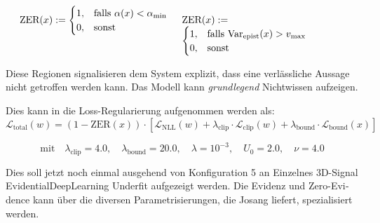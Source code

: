 \begin{otherlanguage}{ngerman}
\begin{equation*}
\begin{minipage}[t]{0.48\linewidth}
\raggedright
$\displaystyle
\text{ZER}(x) := 
\begin{cases}
1, & \text{falls } \alpha(x) < \alpha_{\min} \\
0, & \text{sonst}
\end{cases}
$
\end{minipage}
\hfill
\begin{minipage}[t]{0.48\linewidth}
\raggedright
$\displaystyle
\text{ZER}(x) := 
\begin{cases}
1, & \text{falls } \text{Var}_{\text{epist}}(x) > v_{\max} \\
0, & \text{sonst}
\end{cases}
$
\end{minipage}
\end{equation*}

Diese Regionen signalisieren dem System explizit, dass eine verlässliche Aussage nicht getroffen werden kann. Das Modell kann \textit{grundlegend} Nichtwissen aufzeigen. 

Dies kann in die Loss-Regularierung aufgenommen werden als: 
\[
\mathcal{L}_{\text{total}}(w) = 
(1 - \text{ZER}(x)) \cdot \left[ 
\mathcal{L}_{\text{NLL}}(w) 
+ \lambda_{\text{clip}} \cdot \mathcal{L}_{\text{clip}}(w) 
+ \lambda_{\text{bound}} \cdot \mathcal{L}_{\text{bound}}(x) 
\right]
\]

\[
\text{mit} \quad 
\lambda_{\text{clip}} = 4.0, \quad
\lambda_{\text{bound}} = 20.0, \quad
\lambda = 10^{-3}, \quad
U_0 = 2.0, \quad
\nu = 4.0
\]

Dies soll jetzt noch einmal ausgehend von Konfiguration 5 an \glqq{}Einzelnes 3D-Signal \gls{EvidentialDeepLearning} Underfit\grqq{} aufgezeigt werden. Die Evidenz und \glqq{}Zero-Evidence\grqq{} kann über die diversen Parametrisierungen, die Josang liefert, spezialisiert werden.  


\end{otherlanguage}
